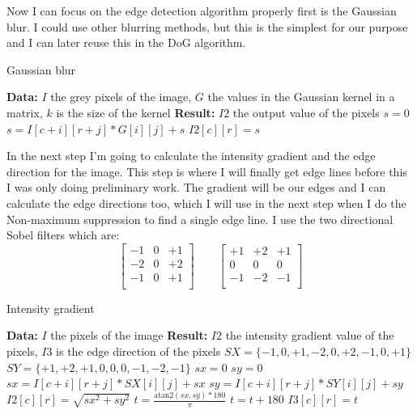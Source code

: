 Now I can focus on the edge detection algorithm properly first is the Gaussian blur. I could use other blurring methods, but this is the simplest for our purpose and I can later reuse this in the \ac{DoG} algorithm.

\begin{algorithm}[H]
\caption{Gaussian blur}
\label{alg:gauss}
\begin{algorithmic}
\State \textbf{Data:} $I$ the grey pixels of the image, $G$ the values in the Gaussian kernel in a matrix, $k$ is the size of the kernel
\State \textbf{Result:} $I2$ the output value of the pixels
\State $s = 0$
\State $s = I[c + i ][r + j] * G[i][j] + s $
\EndFor
\EndFor
\State $I2[c][r] = s$
\EndFor
\end{algorithmic}
\end{algorithm}

In the next step I'm going to calculate the intensity gradient and the edge direction for the image. This step is where I will finally get edge lines before this I was only doing preliminary work. The gradient will be our edges and I can calculate the edge directions too, which I will use in the next step when I do the Non-maximum suppression to find a single edge line. I use the two directional Sobel filters which are:
\[
\begin{bmatrix}
-1 & 0 & +1 \\
-2 & 0 & +2 \\
-1 & 0 & +1 \\
\end{bmatrix} \qquad
\begin{bmatrix}
+1 & +2 & +1 \\
0 & 0 & 0 \\
-1 & -2 & -1 \\
\end{bmatrix}
\]

\begin{algorithm}[H]
\caption{Intensity gradient}
\label{alg:sobel}
\begin{algorithmic}
\State \textbf{Data:} $I$ the pixels of the image
\State \textbf{Result:} $I2$ the intensity gradient value of the pixels, $I3$ is the edge direction of the pixels
\State $SX = \{-1, 0, +1, -2, 0, +2, -1, 0, +1\}$
\State $SY = \{+1, +2, +1, 0, 0, 0, -1, -2, -1\}$
\State $sx = 0$
\State $sy = 0$
\State $sx = I[c + i ][r + j] * SX[i][j] + sx $
\State $sy = I[c + i ][r + j] * SY[i][j] + sy $
\EndFor
\EndFor
\State $I2[c][r] = \sqrt{sx^2+sy^2}$
\State $t = \frac{\text{atan2}(sx,sy) * 180}{\pi} $
\State $t = t + 180$
\EndIf
\State $I3[c][r] = t$
\EndFor
\end{algorithmic}
\end{algorithm}
\clearpage

